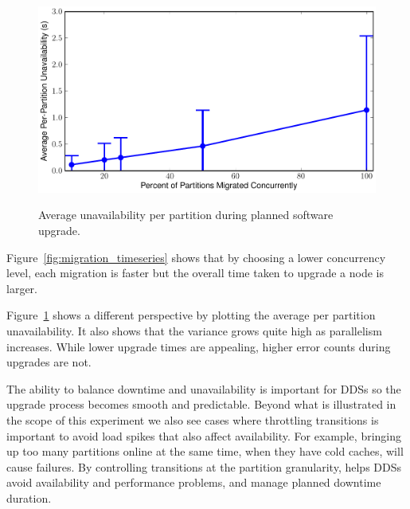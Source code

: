 \begin{figure}[t]
    {\includegraphics[width=\columnwidth]{average-migration.pdf}}
    \vspace*{-2ex}
    \caption{\label{fig:average_timeseries} Average unavailability per partition
during planned software upgrade.}
\end{figure} 

Figure~\ref{fig:migration_timeseries} shows that by choosing a lower concurrency
level, each migration is faster but the overall time taken to upgrade a node is larger.

Figure~\ref{fig:average_timeseries} shows a different perspective by plotting
the average per partition unavailability. It also shows that the variance grows
quite high as parallelism increases. While lower upgrade times are appealing,
higher error counts during upgrades are not.

The ability to balance downtime and unavailability is important for DDSs so the
upgrade process becomes smooth and predictable.  Beyond what is illustrated in
the scope of this experiment we also see cases where throttling transitions is
important to avoid load spikes that also affect availability.  For example,
bringing up too many \ES partitions online at the same time, when they have cold
caches, will cause failures.  By controlling transitions at the partition
granularity, \helix helps DDSs avoid availability and performance problems, and
manage planned downtime duration.

